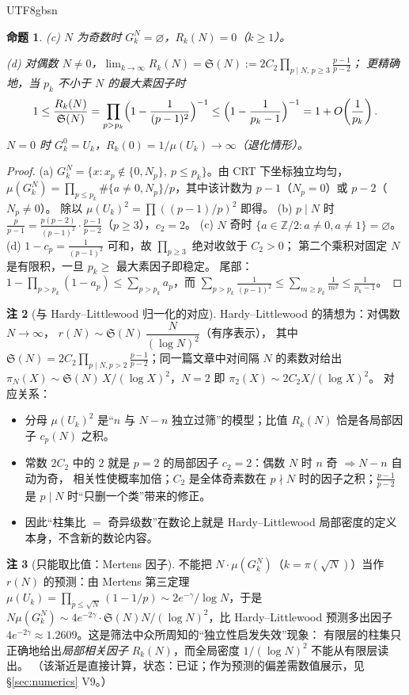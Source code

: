\documentclass[11pt,a4paper]{article}
\newcommand{\Haar}{\mu}
\newcommand{\Sing}{\mathfrak S}
\newcommand{\status}[1]{\par\noindent\fbox{\textbf{状态：#1}}\par\smallskip}
\theoremstyle{plain}
\newtheorem{prop}{命题}[section]
\theoremstyle{definition}
\newtheorem{rem}[prop]{注}
\begin{document}
\begin{CJK}{UTF8}{gbsn}
\begin{prop}
(c) $N$ 为奇数时 $G_k^N=\varnothing$，$R_k(N)=0$（$k\ge1$）。

(d) 对偶数 $N\ne0$，$\lim_{k\to\infty}R_k(N)=\Sing(N):=2C_2\prod_{p\mid N,\,p\ge3}\frac{p-1}{p-2}$；
更精确地，当 $p_k$ 不小于 $N$ 的最大素因子时
\[
1\le\frac{R_k(N)}{\Sing(N)}=\prod_{p>p_k}\Bigl(1-\frac1{(p-1)^2}\Bigr)^{-1}
\le\Bigl(1-\frac1{p_k-1}\Bigr)^{-1}=1+O\!\left(\frac1{p_k}\right).
\]
$N=0$ 时 $G_k^0=U_k$，$R_k(0)=1/\Haar(U_k)\to\infty$（退化情形）。
\end{prop}
\status{已证}
\begin{proof}
(a) $G_k^N=\{x: x_p\notin\{0,N_p\},\ p\le p_k\}$。由 CRT 下坐标独立均匀，
$\Haar(G_k^N)=\prod_{p\le p_k}\#\{a\ne0,N_p\}/p$，其中该计数为 $p-1$（$N_p=0$）或 $p-2$（$N_p\ne0$）。
除以 $\Haar(U_k)^2=\prod((p-1)/p)^2$ 即得。
(b) $p\mid N$ 时 $\frac{p}{p-1}=\frac{p(p-2)}{(p-1)^2}\cdot\frac{p-1}{p-2}$（$p\ge3$），$c_2=2$。
(c) $N$ 奇时 $\{a\in\mathbb Z/2: a\ne0,a\ne1\}=\varnothing$。
(d) $1-c_p=\frac1{(p-1)^2}$ 可和，故 $\prod_{p\ge3}$ 绝对收敛于 $C_2>0$；
第二个乘积对固定 $N$ 是有限积，一旦 $p_k\ge$ 最大素因子即稳定。
尾部：$1-\prod_{p>p_k}(1-a_p)\le\sum_{p>p_k}a_p$，而
$\sum_{p>p_k}\frac1{(p-1)^2}\le\sum_{m\ge p_k}\frac1{m^2}\le\frac1{p_k-1}$。
\end{proof}

\begin{rem}[与 Hardy--Littlewood 归一化的对应]\label{rem:HL}
Hardy--Littlewood \cite{HL23} 的猜想为：对偶数 $N\to\infty$，
$r(N)\sim\Sing(N)\,\dfrac{N}{(\log N)^2}$（有序表示），
其中 $\Sing(N)=2C_2\prod_{p\mid N,p>2}\frac{p-1}{p-2}$；同一篇文章中对间隔 $N$ 的素数对给出
$\pi_N(X)\sim\Sing(N)\,X/(\log X)^2$，$N=2$ 即 $\pi_2(X)\sim 2C_2X/(\log X)^2$。
对应关系：
\begin{itemize}[leftmargin=*]
\item 分母 $\Haar(U_k)^2$ 是“$n$ 与 $N-n$ 独立过筛”的模型；比值 $R_k(N)$ 恰是各局部因子 $c_p(N)$ 之积。
\item 常数 $2C_2$ 中的 $2$ 就是 $p=2$ 的局部因子 $c_2=2$：偶数 $N$ 时 $n$ 奇 $\Rightarrow N-n$ 自动为奇，
相关性使概率加倍；$C_2$ 是全体奇素数在 $p\nmid N$ 时的因子之积；$\frac{p-1}{p-2}$ 是 $p\mid N$ 时“只删一个类”带来的修正。
\item 因此“柱集比 $=$ 奇异级数”在数论上就是 Hardy--Littlewood 局部密度的定义本身，不含新的数论内容。
\end{itemize}
\end{rem}

\begin{rem}[只能取比值：Mertens 因子]\label{rem:mertens}
不能把 $N\cdot\Haar(G_k^N)$（$k=\pi(\sqrt N)$）当作 $r(N)$ 的预测：由 Mertens 第三定理
$\Haar(U_k)=\prod_{p\le\sqrt N}(1-1/p)\sim 2e^{-\gamma}/\log N$，于是
$N\Haar(G_k^N)\sim 4e^{-2\gamma}\cdot\Sing(N)N/(\log N)^2$，比 Hardy--Littlewood 预测多出因子
$4e^{-2\gamma}\approx1.2609$。这是筛法中众所周知的“独立性启发失效”现象：
有限层的柱集只正确地给出\emph{局部相关因子} $R_k(N)$，而全局密度 $1/(\log N)^2$ 不能从有限层读出。
（该渐近是直接计算，状态：已证；作为预测的偏差需数值展示，见 \S\ref{sec:numerics} V9。）
\end{rem}


\end{CJK}
\end{document}
